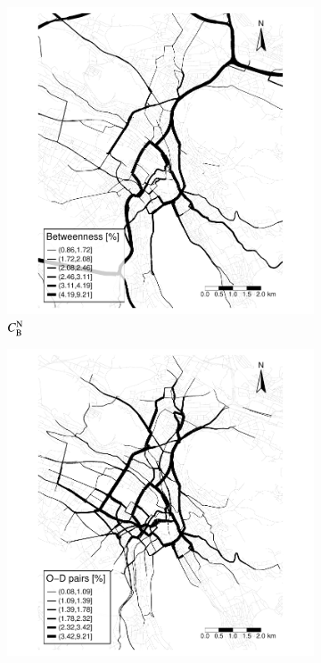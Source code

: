 \documentclass[]{elsarticle} %
\begin{document}
\begin{figure}
\begin{subfigure}{.5\textwidth}
  \centering
  \includegraphics[width=1\linewidth]{Plots/btw_center.pdf}  
  \caption{$C_{\rm B}^{\rm N}$}
\end{subfigure}
\begin{subfigure}{.5\textwidth}
  \centering
  \includegraphics[width=1\linewidth]{Plots/od_center.pdf}  

\end{subfigure}
\end{figure}
\end{document}
